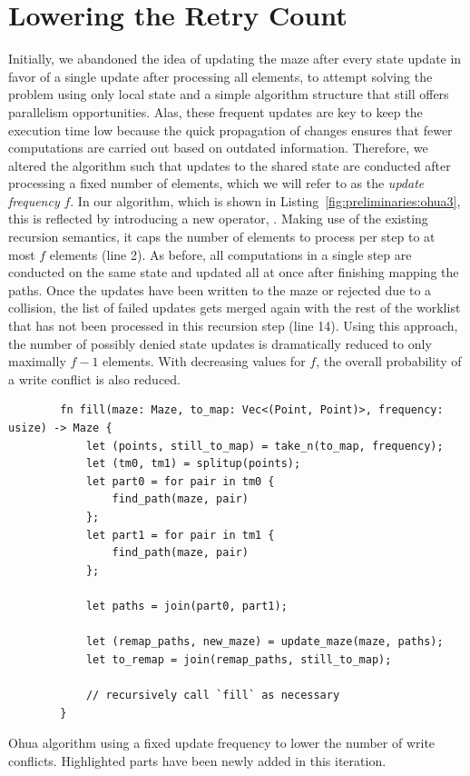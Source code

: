 \section{Lowering the Retry Count}
\label{sec:preliminaries:retries}

Initially, we abandoned the idea of updating the maze after every state update in favor of a single update after processing all elements, to attempt solving the problem using only local state and a simple algorithm structure that still offers parallelism opportunities.
Alas, these frequent updates are key to keep the execution time low because the quick propagation of changes ensures that fewer computations are carried out based on outdated information.
Therefore, we altered the algorithm such that updates to the shared state are conducted after processing a fixed number of elements, which we will refer to as the \emph{update frequency} $f$.
In our algorithm, which is shown in Listing~\ref{fig:preliminaries:ohua3}, this is reflected by introducing a new operator, .
Making use of the existing recursion semantics, it caps the number of elements to process per step to at most $f$ elements (line 2).
As before, all computations in a single step are conducted on the same state and updated all at once after finishing mapping the paths.
Once the updates have been written to the maze or rejected due to a collision, the list of failed updates gets merged again with the rest of the worklist that has not been processed in this recursion step (line 14).
Using this approach, the number of possibly denied state updates is dramatically reduced to only maximally $f - 1$ elements.
With decreasing values for $f$, the overall probability of a write conflict is also reduced.

\begin{listing}[t]
    \begin{verbatim}
        fn fill(maze: Maze, to_map: Vec<(Point, Point)>, frequency: usize) -> Maze {
            let (points, still_to_map) = take_n(to_map, frequency);
            let (tm0, tm1) = splitup(points);
            let part0 = for pair in tm0 {
                find_path(maze, pair)
            };
            let part1 = for pair in tm1 {
                find_path(maze, pair)
            };
        
            let paths = join(part0, part1);
        
            let (remap_paths, new_maze) = update_maze(maze, paths);
            let to_remap = join(remap_paths, still_to_map);
        
            // recursively call `fill` as necessary
        }
    \end{verbatim}
    \caption{Ohua algorithm using a fixed update frequency to lower the number of write conflicts. Highlighted parts have been newly added in this iteration.}%
    \label{fig:preliminaries:ohua3}
\end{listing}

